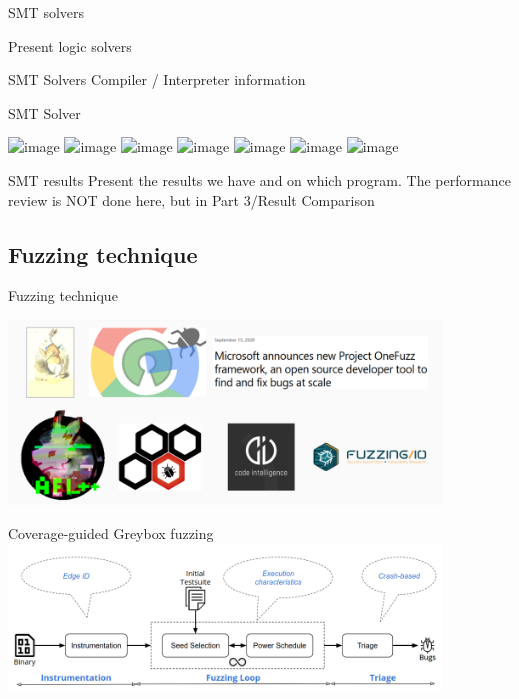 \documentclass{beamer}
\begin{document}
\begin{frame}{SMT solvers}

Present logic solvers

\end{frame}

\begin{frame}{SMT Solvers}
Compiler / Interpreter information
\end{frame}

\begin{frame}{SMT Solver}

\includegraphics<1>[width=9cm]{Figures/SMTsolver/1.png}
\includegraphics<2>[width=9cm]{Figures/SMTsolver/2.png}
\includegraphics<3>[width=9cm]{Figures/SMTsolver/3.png}
\includegraphics<4>[width=9cm]{Figures/SMTsolver/4.png}
\includegraphics<5>[width=9cm]{Figures/SMTsolver/5.png}
\includegraphics<6>[width=9cm]{Figures/SMTsolver/6.png}
\includegraphics<7>[width=9cm]{Figures/SMTsolver/7.png}

\end{frame}

\begin{frame}{SMT results}
Present the results we have and on which program. The performance review is NOT done here, but in Part 3/Result Comparison
\end{frame}

\subsection{Fuzzing technique}

\begin{frame}{Fuzzing technique}

\includegraphics[width=11.5cm]{Figures/Fuzzing/graph1.png}

\end{frame}

\begin{frame}{Coverage-guided Greybox fuzzing}
\includegraphics[width=11.5cm]{Figures/Fuzzing/graph2.png}
\end{frame}
\end{document}
